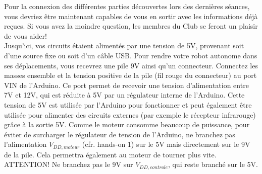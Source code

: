 Pour la connexion des différentes parties découvertes lors des dernières séances, vous devriez être maintenant capables de vous en sortir avec les informations déjà reçues. Si vous avez la moindre question, les membres du Club se feront un plaisir de vous aider!\\

Jusqu'ici, vos circuits étaient alimentés par une tension de 5V, provenant soit d'une source fixe ou soit d'un câble USB. Pour rendre votre robot autonome dans ses déplacements, vous recevrez une pile 9V ainsi qu'un connecteur. Connectez les masses ensemble et la tension positive de la pile (fil rouge du connecteur) au port VIN de l'Arduino. Ce port permet de recevoir une tension d'alimentation entre 7V et 12V, qui est réduite à 5V par un régulateur interne de l'Arduino. Cette tension de 5V est utilisée par l'Arduino pour fonctionner et peut également être utilisée pour alimenter des circuits externes (par exemple le récepteur infrarouge) grâce à la sortie 5V. Comme le moteur consomme beaucoup de puissance, pour éviter de surcharger le régulateur de tension de l'Arduino, ne branchez pas l'alimentation $V_{DD,moteur}$ (cfr. hands-on 1) sur le 5V mais directement sur le 9V de la pile. Cela permettra également au moteur de tourner plus vite. ATTENTION! Ne branchez pas le 9V sur $V_{DD,controle}$, qui reste branché sur le 5V.\\

